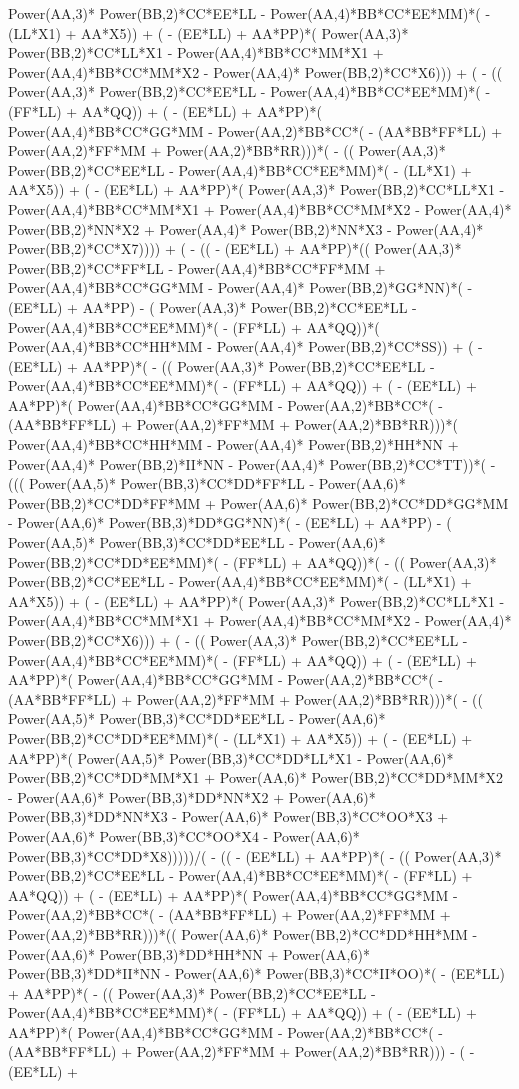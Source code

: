 \documentclass[10pt]{article} %
\begin{document}
{Power(AA,3)* Power(BB,2)*CC*EE*LL -  Power(AA,4)*BB*CC*EE*MM)*( - (LL*X1) + AA*X5)) + ( - (EE*LL) + AA*PP)*( Power(AA,3)* Power(BB,2)*CC*LL*X1 -  Power(AA,4)*BB*CC*MM*X1 +  Power(AA,4)*BB*CC*MM*X2 -  Power(AA,4)* Power(BB,2)*CC*X6))) + ( - (( Power(AA,3)* Power(BB,2)*CC*EE*LL -  Power(AA,4)*BB*CC*EE*MM)*( - (FF*LL) + AA*QQ)) + ( - (EE*LL) + AA*PP)*( Power(AA,4)*BB*CC*GG*MM -  Power(AA,2)*BB*CC*( - (AA*BB*FF*LL) +  Power(AA,2)*FF*MM +  Power(AA,2)*BB*RR)))*( - (( Power(AA,3)* Power(BB,2)*CC*EE*LL -  Power(AA,4)*BB*CC*EE*MM)*( - (LL*X1) + AA*X5)) + ( - (EE*LL) + AA*PP)*( Power(AA,3)* Power(BB,2)*CC*LL*X1 -  Power(AA,4)*BB*CC*MM*X1 +  Power(AA,4)*BB*CC*MM*X2 -  Power(AA,4)* Power(BB,2)*NN*X2 +  Power(AA,4)* Power(BB,2)*NN*X3 -  Power(AA,4)* Power(BB,2)*CC*X7)))) + ( - (( - (EE*LL) + AA*PP)*(( Power(AA,3)* Power(BB,2)*CC*FF*LL -  Power(AA,4)*BB*CC*FF*MM +  Power(AA,4)*BB*CC*GG*MM -  Power(AA,4)* Power(BB,2)*GG*NN)*( - (EE*LL) + AA*PP) - ( Power(AA,3)* Power(BB,2)*CC*EE*LL -  Power(AA,4)*BB*CC*EE*MM)*( - (FF*LL) + AA*QQ))*( Power(AA,4)*BB*CC*HH*MM -  Power(AA,4)* Power(BB,2)*CC*SS)) + ( - (EE*LL) + AA*PP)*( - (( Power(AA,3)* Power(BB,2)*CC*EE*LL -  Power(AA,4)*BB*CC*EE*MM)*( - (FF*LL) + AA*QQ)) + ( - (EE*LL) + AA*PP)*( Power(AA,4)*BB*CC*GG*MM -  Power(AA,2)*BB*CC*( - (AA*BB*FF*LL) +  Power(AA,2)*FF*MM +  Power(AA,2)*BB*RR)))*( Power(AA,4)*BB*CC*HH*MM -  Power(AA,4)* Power(BB,2)*HH*NN +  Power(AA,4)* Power(BB,2)*II*NN -  Power(AA,4)* Power(BB,2)*CC*TT))*( - ((( Power(AA,5)* Power(BB,3)*CC*DD*FF*LL -  Power(AA,6)* Power(BB,2)*CC*DD*FF*MM +  Power(AA,6)* Power(BB,2)*CC*DD*GG*MM -  Power(AA,6)* Power(BB,3)*DD*GG*NN)*( - (EE*LL) + AA*PP) - ( Power(AA,5)* Power(BB,3)*CC*DD*EE*LL -  Power(AA,6)* Power(BB,2)*CC*DD*EE*MM)*( - (FF*LL) + AA*QQ))*( - (( Power(AA,3)* Power(BB,2)*CC*EE*LL -  Power(AA,4)*BB*CC*EE*MM)*( - (LL*X1) + AA*X5)) + ( - (EE*LL) + AA*PP)*( Power(AA,3)* Power(BB,2)*CC*LL*X1 -  Power(AA,4)*BB*CC*MM*X1 +  Power(AA,4)*BB*CC*MM*X2 -  Power(AA,4)* Power(BB,2)*CC*X6))) + ( - (( Power(AA,3)* Power(BB,2)*CC*EE*LL -  Power(AA,4)*BB*CC*EE*MM)*( - (FF*LL) + AA*QQ)) + ( - (EE*LL) + AA*PP)*( Power(AA,4)*BB*CC*GG*MM -  Power(AA,2)*BB*CC*( - (AA*BB*FF*LL) +  Power(AA,2)*FF*MM +  Power(AA,2)*BB*RR)))*( - (( Power(AA,5)* Power(BB,3)*CC*DD*EE*LL -  Power(AA,6)* Power(BB,2)*CC*DD*EE*MM)*( - (LL*X1) + AA*X5)) + ( - (EE*LL) + AA*PP)*( Power(AA,5)* Power(BB,3)*CC*DD*LL*X1 -  Power(AA,6)* Power(BB,2)*CC*DD*MM*X1 +  Power(AA,6)* Power(BB,2)*CC*DD*MM*X2 -  Power(AA,6)* Power(BB,3)*DD*NN*X2 +  Power(AA,6)* Power(BB,3)*DD*NN*X3 -  Power(AA,6)* Power(BB,3)*CC*OO*X3 +  Power(AA,6)* Power(BB,3)*CC*OO*X4 -  Power(AA,6)* Power(BB,3)*CC*DD*X8)))))/( - (( - (EE*LL) + AA*PP)*( - (( Power(AA,3)* Power(BB,2)*CC*EE*LL -  Power(AA,4)*BB*CC*EE*MM)*( - (FF*LL) + AA*QQ)) + ( - (EE*LL) + AA*PP)*( Power(AA,4)*BB*CC*GG*MM -  Power(AA,2)*BB*CC*( - (AA*BB*FF*LL) +  Power(AA,2)*FF*MM +  Power(AA,2)*BB*RR)))*(( Power(AA,6)* Power(BB,2)*CC*DD*HH*MM -  Power(AA,6)* Power(BB,3)*DD*HH*NN +  Power(AA,6)* Power(BB,3)*DD*II*NN -  Power(AA,6)* Power(BB,3)*CC*II*OO)*( - (EE*LL) + AA*PP)*( - (( Power(AA,3)* Power(BB,2)*CC*EE*LL -  Power(AA,4)*BB*CC*EE*MM)*( - (FF*LL) + AA*QQ)) + ( - (EE*LL) + AA*PP)*( Power(AA,4)*BB*CC*GG*MM -  Power(AA,2)*BB*CC*( - (AA*BB*FF*LL) +  Power(AA,2)*FF*MM +  Power(AA,2)*BB*RR))) - ( - (EE*LL) + }
\end{document}
